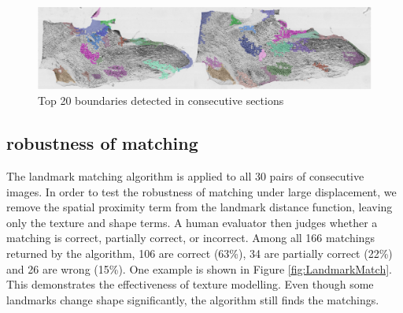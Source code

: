 \documentclass{llncs}
\begin{document}
\begin{figure}
	\includegraphics[width=\textwidth]{../figures/TopRegions_0006_0007_Horizontal.png}
	\caption{Top 20 boundaries detected in consecutive sections}
	\label{fig:TopRegions}
\end{figure}


\subsection{robustness of matching}

The landmark matching algorithm is applied to all 30 pairs of consecutive images. In order to test the robustness of matching under large displacement, we remove the spatial proximity term from the landmark distance function, leaving only the texture and shape terms. A human evaluator then judges whether a matching is correct, partially correct, or incorrect. Among all 166 matchings returned by the algorithm, 106 are correct (63\%), 34 are partially correct (22\%) and 26 are wrong (15\%). One example is shown in Figure \ref{fig:LandmarkMatch}. This demonstrates the effectiveness of texture modelling. Even though some landmarks change shape significantly, the algorithm still finds the matchings.
\end{document}
